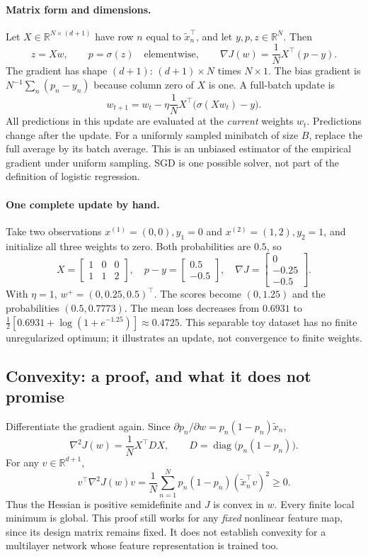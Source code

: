 \paragraph{Matrix form and dimensions.}
Let $X\in\mathbb R^{N\times(d+1)}$ have row $n$ equal to $\tilde x_n^\top$,
and let $y,p,z\in\mathbb R^N$. Then
\[
z=Xw,\qquad p=\sigma(z)\quad\text{elementwise},\qquad
\boxed{\nabla J(w)=\frac1N X^\top(p-y).}
\]
The gradient has shape $(d+1)$: $(d+1)\times N$ times $N\times1$.
The bias gradient is $N^{-1}\sum_n(p_n-y_n)$ because column zero of $X$ is one.
A full-batch update is
\[
w_{t+1}=w_t-\eta\frac1N X^\top\bigl(\sigma(Xw_t)-y\bigr).
\]
All predictions in this update are evaluated at the \emph{current} weights
$w_t$. Predictions change after the update. For a uniformly sampled minibatch
of size $B$, replace the full average by its batch average. This is an unbiased
estimator of the empirical gradient under uniform sampling. SGD is one possible
solver, not part of the definition of logistic regression.

\paragraph{One complete update by hand.}
Take two observations $x^{(1)}=(0,0),y_1=0$ and
$x^{(2)}=(1,2),y_2=1$, and initialize all three weights to zero. Both
probabilities are $0.5$, so
\[
X=\begin{bmatrix}1&0&0\\1&1&2\end{bmatrix},\quad
p-y=\begin{bmatrix}0.5\\-0.5\end{bmatrix},\quad
\nabla J=\begin{bmatrix}0\\-0.25\\-0.5\end{bmatrix}.
\]
With $\eta=1$, $w^+=(0,0.25,0.5)^\top$. The scores become $(0,1.25)$ and the
probabilities $(0.5,0.7773)$. The mean loss decreases from $0.6931$ to
$\tfrac12[0.6931+\log(1+e^{-1.25})]\approx0.4725$.
This separable toy dataset has no finite unregularized optimum; it illustrates
an update, not convergence to finite weights.

\subsection{Convexity: a proof, and what it does not promise}
Differentiate the gradient again. Since $\partial p_n/\partial w
=p_n(1-p_n)\tilde x_n$,
\begin{equation}
\nabla^2J(w)=\frac1N X^\top D X,\qquad
D=\operatorname{diag}\bigl(p_n(1-p_n)\bigr).
\label{eq:lr11-hessian}
\end{equation}
For any $v\in\mathbb R^{d+1}$,
\[
v^\top\nabla^2J(w)v
=\frac1N\sum_{n=1}^N p_n(1-p_n)(\tilde x_n^\top v)^2\geq0.
\]
Thus the Hessian is positive semidefinite and $J$ is convex in $w$.
Every finite local minimum is global. This proof still works for any \emph{fixed}
nonlinear feature map, since its design matrix remains fixed. It does not establish
convexity for a multilayer network whose feature representation is trained too.

